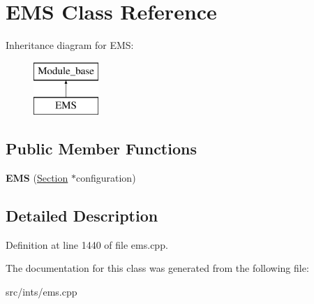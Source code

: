 \hypertarget{classEMS}{\section{E\-M\-S Class Reference}
\label{classEMS}
}
Inheritance diagram for E\-M\-S\-:\begin{figure}[H]
\begin{center}
\leavevmode
\includegraphics[height=2.000000cm]{classEMS}
\end{center}
\end{figure}
\subsection*{Public Member Functions}
\begin{DoxyCompactItemize}
\item 
\hypertarget{classEMS_a580595567b3555bb47ee6d0eb1187815}{{\bfseries E\-M\-S} (\hyperlink{classSection}{Section} $\ast$configuration)}\label{classEMS_a580595567b3555bb47ee6d0eb1187815}

\end{DoxyCompactItemize}


\subsection{Detailed Description}


Definition at line 1440 of file ems.\-cpp.



The documentation for this class was generated from the following file\-:\begin{DoxyCompactItemize}
\item 
src/ints/ems.\-cpp\end{DoxyCompactItemize}
